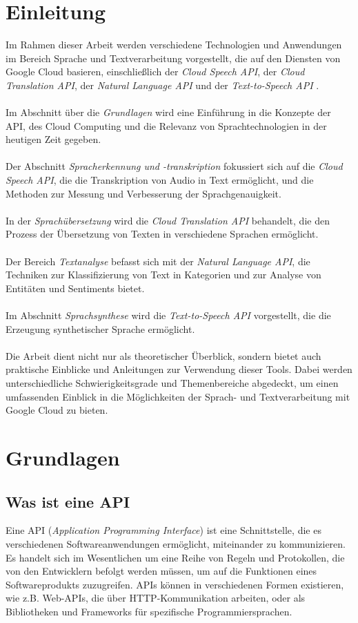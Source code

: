 \documentclass[12pt,a4paper]{article}
\begin{document}
\section*{Einleitung}
Im Rahmen dieser Arbeit werden verschiedene Technologien und Anwendungen im Bereich Sprache und Textverarbeitung vorgestellt, die auf den Diensten von Google Cloud basieren, einschließlich der \textit{Cloud Speech API}, der \textit{Cloud Translation API}, der \textit{Natural Language API} und der \textit{Text-to-Speech API} \cite{google}.
\\ \\
Im Abschnitt über die \textit{Grundlagen} wird eine Einführung in die Konzepte der API, des Cloud Computing und die Relevanz von Sprachtechnologien in der heutigen Zeit gegeben.
\\ \\
Der Abschnitt \textit{Spracherkennung und -transkription} fokussiert sich auf die \textit{Cloud Speech API}, die die Transkription von Audio in Text ermöglicht, und die Methoden zur Messung und Verbesserung der Sprachgenauigkeit.
\\ \\
In der \textit{Sprachübersetzung} wird die \textit{Cloud Translation API} behandelt, die den Prozess der Übersetzung von Texten in verschiedene Sprachen ermöglicht.
\\ \\
Der Bereich \textit{Textanalyse} befasst sich mit der \textit{Natural Language API}, die Techniken zur Klassifizierung von Text in Kategorien und zur Analyse von Entitäten und Sentiments bietet.
\\ \\
Im Abschnitt \textit{Sprachsynthese} wird die \textit{Text-to-Speech API} vorgestellt, die die Erzeugung synthetischer Sprache ermöglicht.
\\ \\
Die Arbeit dient nicht nur als theoretischer Überblick, sondern bietet auch praktische Einblicke und Anleitungen zur Verwendung dieser Tools. Dabei werden unterschiedliche Schwierigkeitsgrade und Themenbereiche abgedeckt, um einen umfassenden Einblick in die Möglichkeiten der Sprach- und Textverarbeitung mit Google Cloud zu bieten.

	
\newpage

\section{Grundlagen}
\subsection{Was ist eine API}
Eine API (\textit{Application Programming Interface}) ist eine Schnittstelle, die es verschiedenen Softwareanwendungen ermöglicht, miteinander zu kommunizieren. Es handelt sich im Wesentlichen um eine Reihe von Regeln und Protokollen, die von den Entwicklern befolgt werden müssen, um auf die Funktionen eines Softwareprodukts zuzugreifen. APIs können in verschiedenen Formen existieren, wie z.B. Web-APIs, die über HTTP-Kommunikation arbeiten, oder als Bibliotheken und Frameworks für spezifische Programmiersprachen.
\end{document}
